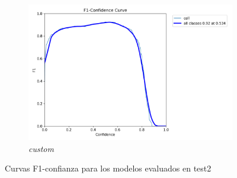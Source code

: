 \documentclass[12pt,a4paper,onecolumn,oneside]{report}
\begin{document}
\begin{figure}[H]
  \vspace{0.5cm}
  \begin{subfigure}[b]{0.48\textwidth}
    \centering
    \includegraphics[width=\textwidth]{figuras/resultados experimentacion/custom/test2/BoxF1_curve.png}
    \caption{\textit{custom}}
    \label{fig:custom_test2}
  \end{subfigure}
  
  \caption{Curvas F1-confianza para los modelos evaluados en test2}
  \label{fig:f1_curves_test2}
\end{figure}
\end{document}
